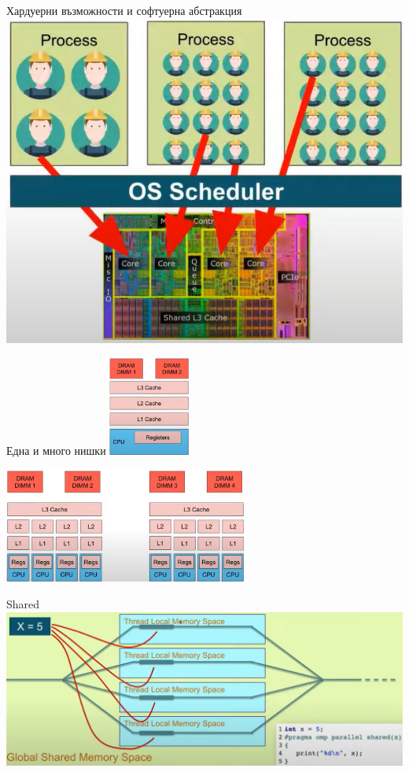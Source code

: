 \documentclass{beamer}
\begin{document}
\begin{frame}[plain]{Хардуерни възможности и софтуерна абстракция}
  \includegraphics[width=\textwidth]{soft-hard1}
\end{frame}

\begin{frame}{Една и много нишки}
  \centering
  \includegraphics[width=0.2\textwidth]{single-thread}  \pause

  \includegraphics[width=0.6\textwidth]{multi-thread.png}  

\end{frame}


\begin{frame}{Shared}
  \includegraphics[width=\textwidth]{shared}    
\end{frame}
\end{document}
